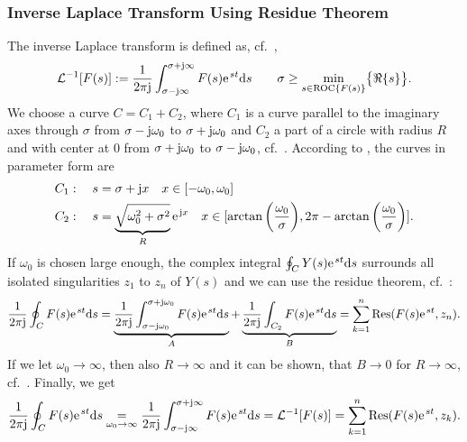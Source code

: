 \documentclass[11pt,a4paper,DIV=12]{scrartcl}
\begin{document}
\subsubsection{Inverse Laplace Transform Using Residue Theorem}
The inverse Laplace transform is defined as, cf.~\cite{UlrichWeber2017},
\begin{align}
\mathcal{L}^{-1}[F(s)]:=\frac{1}{2\pi\im}\int_{\sigma-\im\infty}^{\sigma+\im\infty}F(s)\e^{st}\mathrm{d}s\quad\quad \sigma \geq \underset{s \in \mathrm{ROC} \{ F(s) \} }{\min}\big \{ \Re \{ s \} \big \}.
\end{align}
%
We choose a curve $C = C_1 + C_2$, where $C_1$ is a curve parallel to the imaginary axes through $\sigma$ from $\sigma -\im\omega_0$ to $\sigma + \im\omega_0$ and $C_2$ a part of a circle with radius $R$ and with center at $0$ from $\sigma +\im\omega_0$ to $\sigma - \im\omega_0$, cf.~\cite{UlrichWeber2017}.
According to \cite[Fig.~3.5]{UlrichWeber2017}, the curves in parameter form are
\begin{align}
	&C_1:\quad s = \sigma+\im x \quad x \in [-\omega_0,\omega_0] \\
	&C_2:\quad s = \underbrace{\sqrt{\omega_0^2+\sigma^2}}_R \e^{\im x} \quad x \in [\arctan\bigg (\frac{\omega_0}{\sigma}\bigg ) ,2\pi-\arctan\bigg ( \frac{\omega_0}{\sigma}\bigg ) ].
\end{align}
%
If $\omega_0$ is chosen large enough, the complex integral $\oint_CY(s)\e^{st}\mathrm{d}s$ surrounds all isolated singularities $z_1$ to $z_n$ of $Y(s)$ and we can use the residue theorem, cf.~\cite{UlrichWeber2017}:
\begin{align}
	\frac{1}{2\pi\im}\oint_C F(s)\e^{st}\mathrm{d}s=\underbrace{\frac{1}{2\pi\im}\int_{\sigma-\im\omega_0}^{\sigma+\im\omega_0}F(s)\e^{st}\mathrm{d}s}_{A}+\underbrace{\frac{1}{2\pi\im}\int_{C_2}F(s)\e^{st}\mathrm{d}s}_{B}=\sum_{k=1}^{n}\mathrm{Res}(F(s)\e^{st},z_n).
\end{align}
%
If we let $\omega_0\rightarrow\infty$, then also $R\rightarrow\infty$ and it can be shown, that $B \rightarrow 0$ for $R\rightarrow \infty$, cf.~\cite{UlrichWeber2017}.
%
Finally, we get
\begin{align}
\label{eq:InvLaplace2ResidueTheorem}
	\frac{1}{2\pi\im}\oint_C F(s)\e^{st}\mathrm{d}s\underset{\omega_0\rightarrow\infty}{=}\frac{1}{2\pi\im}\int_{\sigma-\im\infty}^{\sigma+\im\infty}F(s)\e^{st}\mathrm{d}s=\mathcal{L}^{-1}[F(s)]=\sum_{k=1}^{n}\mathrm{Res}(F(s)\e^{st},z_k).
\end{align}
\end{document}
